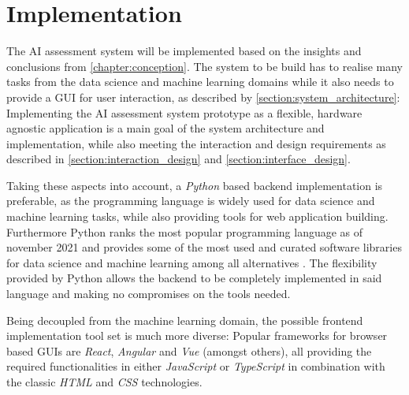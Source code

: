 \documentclass[11pt,a4paper,english]{scrreprt}
\begin{document}
\newpage
\chapter{Implementation}\label{chapter:implementation}
The AI assessment system will be implemented based on the insights and conclusions from \autoref{chapter:conception}. The system to be build has to realise many tasks from the data science and machine learning domains while it also needs to provide a GUI for user interaction, as described by \autoref{section:system_architecture}: Implementing the AI assessment system prototype as a flexible, hardware agnostic application is a main goal of the system architecture and implementation, while also meeting the interaction and design requirements as described in \autoref{section:interaction_design} and \autoref{section:interface_design}.

Taking these aspects into account, a \textit{Python} based backend implementation is preferable, as the programming language is widely used for data science and machine learning tasks, while also providing tools for web application building. Furthermore Python ranks the most popular programming language as of november 2021 and provides some of the most used and curated software libraries for data science and machine learning among all alternatives \parencite{toibe_index_python_website,numpy_github,pandas_github,pytorch_website}. The flexibility provided by Python allows the backend to be completely implemented in said language and making no compromises on the tools needed.

Being decoupled from the machine learning domain, the possible frontend implementation tool set is much more diverse: Popular frameworks for browser based GUIs are \textit{React}, \textit{Angular} and \textit{Vue} (amongst others), all providing the required functionalities in either \textit{JavaScript} or \textit{TypeScript} in combination with the classic \textit{HTML} and \textit{CSS} technologies.
\end{document}
